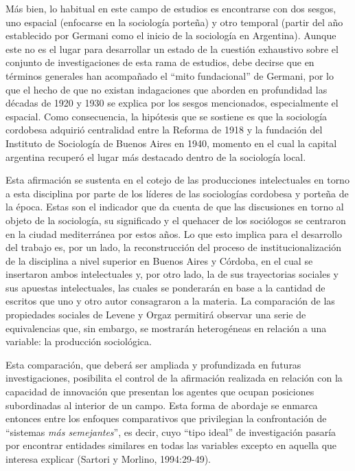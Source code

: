 Más bien, lo habitual en este campo de estudios es encontrarse con dos sesgos, uno espacial (enfocarse en la sociología porteña) y otro temporal (partir del año establecido por Germani como el inicio de la sociología en Argentina). Aunque este no es el lugar para desarrollar un estado de la cuestión exhaustivo sobre el conjunto de investigaciones de esta rama de estudios, debe decirse que en términos generales han acompañado el ``mito fundacional'' de Germani, por lo que el hecho de que no existan indagaciones que aborden en profundidad las décadas de 1920 y 1930 se explica por los sesgos mencionados, especialmente el espacial. Como consecuencia, la hipótesis que se sostiene es que la sociología cordobesa adquirió centralidad entre la Reforma de 1918 y la fundación del Instituto de Sociología de Buenos Aires en 1940, momento en el cual la capital argentina recuperó el lugar más destacado dentro de la sociología local.

Esta afirmación se sustenta en el cotejo de las producciones intelectuales en torno a esta disciplina por parte de los líderes de las sociologías cordobesa y porteña de la época. Estas son el indicador que da cuenta de que las discusiones en torno al objeto de la sociología, su significado y el quehacer de los sociólogos se centraron en la ciudad mediterránea por estos años. Lo que esto implica para el desarrollo del trabajo es, por un lado, la reconstrucción del proceso de institucionalización de la disciplina a nivel superior en Buenos Aires y Córdoba, en el cual se insertaron ambos intelectuales y, por otro lado, la de sus trayectorias sociales y sus apuestas intelectuales, las cuales se ponderarán en base a la cantidad de escritos que uno y otro autor consagraron a la materia. La comparación de las propiedades sociales de Levene y Orgaz permitirá observar una serie de equivalencias que, sin embargo, se mostrarán heterogéneas en relación a una variable: la producción sociológica.

Esta comparación, que deberá ser ampliada y profundizada en futuras investigaciones, posibilita el control de la afirmación realizada en relación con la capacidad de innovación que presentan los agentes que ocupan posiciones subordinadas al interior de un campo. Esta forma de abordaje se enmarca entonces entre los enfoques comparativos que privilegian la confrontación de ``sistemas \emph{más semejantes}'', es decir, cuyo ``tipo ideal'' de investigación pasaría por encontrar entidades similares en todas las variables excepto en aquella que interesa explicar (Sartori y Morlino, 1994:29-49).

